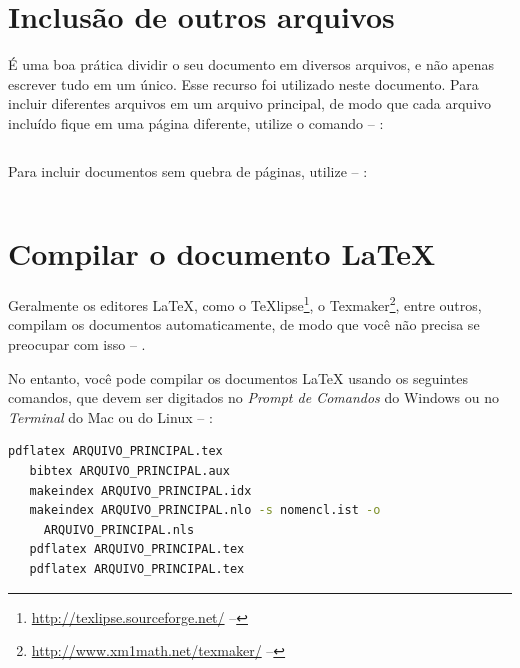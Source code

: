\section{Inclusão de outros arquivos}\label{sec-include}

É uma boa prática dividir o seu documento em diversos arquivos, e não
apenas escrever tudo em um único. Esse recurso foi utilizado neste
documento. Para incluir diferentes arquivos em um arquivo principal,
de modo que cada arquivo incluído fique em uma página diferente, utilize o
comando -- \showfont:

\begin{lstlisting}[language=tex]
         % sem a extensão .tex
\end{lstlisting}

Para incluir documentos sem quebra de páginas, utilize -- \showfont:

\begin{lstlisting}[language=tex]
         % sem a extensão .tex
\end{lstlisting}



\section{Compilar o documento \LaTeX{}}

Geralmente os editores \LaTeX{}, como o
TeXlipse\footnote{\url{http://texlipse.sourceforge.net/} -- \showfont}, o
Texmaker\footnote{\url{http://www.xm1math.net/texmaker/} -- \showfont}, entre outros,
compilam os documentos automaticamente, de modo que você não precisa se
preocupar com isso -- \showfont.

No entanto, você pode compilar os documentos \LaTeX{} usando os seguintes
comandos, que devem ser digitados no \emph{Prompt de Comandos} do Windows ou no
\emph{Terminal} do Mac ou do Linux -- \showfont:

\begin{lstlisting}[language=bash,caption={[Você pode compilar os documentos \LaTeX{} usando os seguintes
        comandos.]{Você pode compilar os documentos \LaTeX{} usando os seguintes
        comandos. -- \showfont}},label={lst:compilarLatex}]
   pdflatex ARQUIVO_PRINCIPAL.tex
   bibtex ARQUIVO_PRINCIPAL.aux
   makeindex ARQUIVO_PRINCIPAL.idx
   makeindex ARQUIVO_PRINCIPAL.nlo -s nomencl.ist -o
     ARQUIVO_PRINCIPAL.nls
   pdflatex ARQUIVO_PRINCIPAL.tex
   pdflatex ARQUIVO_PRINCIPAL.tex
\end{lstlisting}


